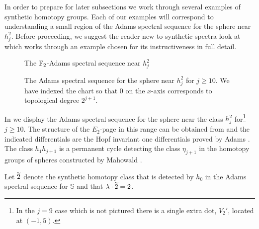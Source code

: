 In order to prepare for later subsections we work through several examples of synthetic homotopy groups. Each of our examples will correspond to understanding a small region of the Adams spectral sequence for the sphere near $h_j^2$. Before proceeding, we suggest the reader new to synthetic spectra look at \cite[Section A.2]{boundaries} which works through an example chosen for its instructiveness in full detail.



\begin{figure}[t]
  \centering
  The $\operatorname{\mathbb{F}}_2$-Adams spectral sequence near $h_j^2$ \\\vspace{6pt}
  \scalebox{1.00}{
    \printpage[ name = thetaASS, page = 2 ]
  }
  \caption{
    The Adams spectral sequence for the sphere near $h_j^2$ for $j \geq 10$.
    We have indexed the chart so that $0$ on the $x$-axis corresponds to topological degree $2^{j+1}$.
  }
  \label{fig:hj2}    
\end{figure}

In  we display the Adams spectral sequence for the sphere near the class $h_j^2$ for\footnote{In the $j=9$ case which is not pictured there is a single extra dot, $V_2'$, located at $(-1,5)$.} $j \geq 10$.
The structure of the $E_2$-page in this range can be obtained from \cite{Ext5} and the indicated differentials are the Hopf invariant one differentials proved by Adams \cite{Adams}.
The class $h_1h_{j+1}$ is a permanent cycle detecting the class $\eta_{j+1}$ in the homotopy groups of spheres constructed by Mahowald \cite{etaj}.

Let $\wt{2}$ denote the synthetic homotopy class that is detected by $h_0$ in the Adams spectral sequence for $\mathbb{S}$ and that $\lambda \cdot \wt{2} = 2$.

